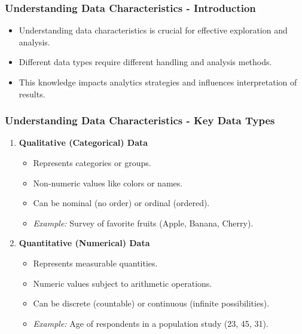 \documentclass[aspectratio=169]{beamer}
\begin{document}
\begin{frame}[fragile]
    \frametitle{Understanding Data Characteristics - Introduction}
    \begin{itemize}
        \item Understanding data characteristics is crucial for effective exploration and analysis.
        \item Different data types require different handling and analysis methods.
        \item This knowledge impacts analytics strategies and influences interpretation of results.
    \end{itemize}
\end{frame}

\begin{frame}[fragile]
    \frametitle{Understanding Data Characteristics - Key Data Types}
    \begin{enumerate}
        \item \textbf{Qualitative (Categorical) Data}
            \begin{itemize}
                \item Represents categories or groups.
                \item Non-numeric values like colors or names.
                \item Can be nominal (no order) or ordinal (ordered).
                \item \textit{Example:} Survey of favorite fruits (Apple, Banana, Cherry).
            \end{itemize}

        \item \textbf{Quantitative (Numerical) Data}
            \begin{itemize}
                \item Represents measurable quantities.
                \item Numeric values subject to arithmetic operations.
                \item Can be discrete (countable) or continuous (infinite possibilities).
                \item \textit{Example:} Age of respondents in a population study (23, 45, 31).
            \end{itemize}
    \end{enumerate}
\end{frame}
\end{document}
